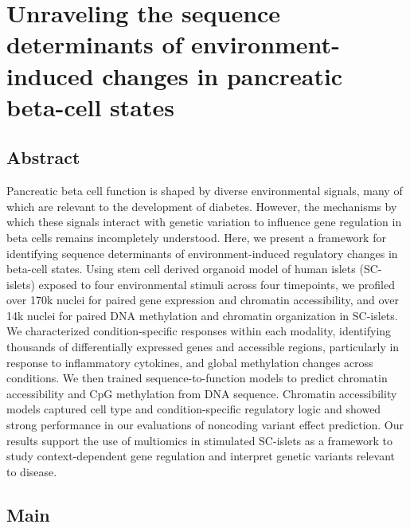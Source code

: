 \chapter{Unraveling the sequence determinants of environment-induced changes in pancreatic beta-cell states}
\label{chap:chapter 3}

\section{Abstract}

Pancreatic beta cell function is shaped by diverse environmental signals, many of which are relevant to the development of diabetes. However, the mechanisms by which these signals interact with genetic variation to influence gene regulation in beta cells remains incompletely understood. Here, we present a framework for identifying sequence determinants of environment-induced regulatory changes in beta-cell states. Using stem cell derived organoid model of human islets (SC-islets) exposed to four environmental stimuli across four timepoints, we profiled over 170k nuclei for paired gene expression and chromatin accessibility, and over 14k nuclei for paired DNA methylation and chromatin organization in SC-islets. We characterized condition-specific responses within each modality, identifying thousands of differentially expressed genes and accessible regions, particularly in response to inflammatory cytokines, and global methylation changes across conditions. We then trained sequence-to-function models to predict chromatin accessibility and CpG methylation from DNA sequence. Chromatin accessibility models captured cell type and condition-specific regulatory logic and showed strong performance in our evaluations of noncoding variant effect prediction. Our results support the use of multiomics in stimulated SC-islets as a framework to study context-dependent gene regulation and interpret genetic variants relevant to disease.

\section{Main}

